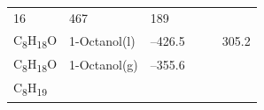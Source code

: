 \documentclass[
]{book}
\theoremstyle{definition}
\theoremstyle{definition}
\theoremstyle{definition}
\theoremstyle{remark}
\begin{document}
\begin{longtable}[]{@{}llllll@{}}
\begin{minipage}[t]{0.15\columnwidth}
16\strut
\end{minipage} & \begin{minipage}[t]{0.14\columnwidth}\raggedright
467\strut
\end{minipage} & \begin{minipage}[t]{0.14\columnwidth}\raggedright
189\strut
\end{minipage}\tabularnewline
\begin{minipage}[t]{0.07\columnwidth}\raggedright
C\textsubscript{8}H\textsubscript{18}O\strut
\end{minipage} & \begin{minipage}[t]{0.17\columnwidth}\raggedright
1-Octanol(l)\strut
\end{minipage} & \begin{minipage}[t]{0.15\columnwidth}\raggedright
--426.5\strut
\end{minipage} & \begin{minipage}[t]{0.15\columnwidth}\raggedright
\strut
\end{minipage} & \begin{minipage}[t]{0.14\columnwidth}\raggedright
\strut
\end{minipage} & \begin{minipage}[t]{0.14\columnwidth}\raggedright
305.2\strut
\end{minipage}\tabularnewline
\begin{minipage}[t]{0.07\columnwidth}\raggedright
C\textsubscript{8}H\textsubscript{18}O\strut
\end{minipage} & \begin{minipage}[t]{0.17\columnwidth}\raggedright
1-Octanol(g)\strut
\end{minipage} & \begin{minipage}[t]{0.15\columnwidth}\raggedright
--355.6\strut
\end{minipage} & \begin{minipage}[t]{0.15\columnwidth}\raggedright
\strut
\end{minipage} & \begin{minipage}[t]{0.14\columnwidth}\raggedright
\strut
\end{minipage} & \begin{minipage}[t]{0.14\columnwidth}\raggedright
\strut
\end{minipage}\tabularnewline
\begin{minipage}[t]{0.07\columnwidth}\raggedright
C\textsubscript{8}H\textsubscript{19}\strut
\end{minipage} & \begin{minipage}[t]{0.17\columnwidth}\raggedright

\end{minipage}
\end{longtable}
\end{document}
